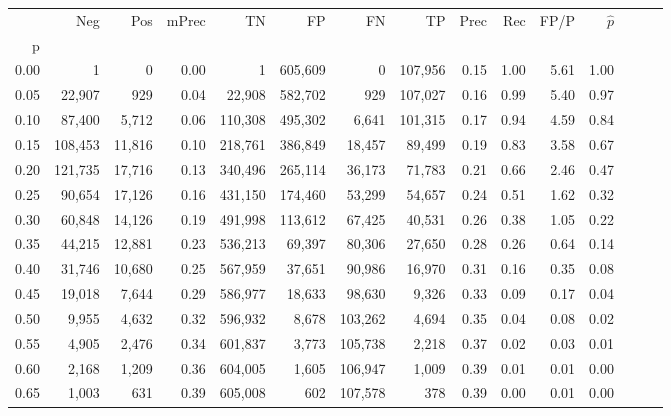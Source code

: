 \begin{tabular}{rrrrrrrrrrrrrrr}
\toprule
{} &      Neg &     Pos & mPrec &       TN &       FP &       FN &       TP &  Prec &   Rec &  FP/P & $\hat{p}$ \\
p    &          &         &       &          &          &          &          &       &       &       &           \\
\midrule
0.00 &        1 &       0 &  0.00 &        1 &  605,609 &        0 &  107,956 &  0.15 &  1.00 &  5.61 &      1.00 \\
0.05 &   22,907 &     929 &  0.04 &   22,908 &  582,702 &      929 &  107,027 &  0.16 &  0.99 &  5.40 &      0.97 \\
0.10 &   87,400 &   5,712 &  0.06 &  110,308 &  495,302 &    6,641 &  101,315 &  0.17 &  0.94 &  4.59 &      0.84 \\
0.15 &  108,453 &  11,816 &  0.10 &  218,761 &  386,849 &   18,457 &   89,499 &  0.19 &  0.83 &  3.58 &      0.67 \\
0.20 &  121,735 &  17,716 &  0.13 &  340,496 &  265,114 &   36,173 &   71,783 &  0.21 &  0.66 &  2.46 &      0.47 \\
0.25 &   90,654 &  17,126 &  0.16 &  431,150 &  174,460 &   53,299 &   54,657 &  0.24 &  0.51 &  1.62 &      0.32 \\
0.30 &   60,848 &  14,126 &  0.19 &  491,998 &  113,612 &   67,425 &   40,531 &  0.26 &  0.38 &  1.05 &      0.22 \\
0.35 &   44,215 &  12,881 &  0.23 &  536,213 &   69,397 &   80,306 &   27,650 &  0.28 &  0.26 &  0.64 &      0.14 \\
0.40 &   31,746 &  10,680 &  0.25 &  567,959 &   37,651 &   90,986 &   16,970 &  0.31 &  0.16 &  0.35 &      0.08 \\
0.45 &   19,018 &   7,644 &  0.29 &  586,977 &   18,633 &   98,630 &    9,326 &  0.33 &  0.09 &  0.17 &      0.04 \\
0.50 &    9,955 &   4,632 &  0.32 &  596,932 &    8,678 &  103,262 &    4,694 &  0.35 &  0.04 &  0.08 &      0.02 \\
0.55 &    4,905 &   2,476 &  0.34 &  601,837 &    3,773 &  105,738 &    2,218 &  0.37 &  0.02 &  0.03 &      0.01 \\
0.60 &    2,168 &   1,209 &  0.36 &  604,005 &    1,605 &  106,947 &    1,009 &  0.39 &  0.01 &  0.01 &      0.00 \\
0.65 &    1,003 &     631 &  0.39 &  605,008 &      602 &  107,578 &      378 &  0.39 &  0.00 &  0.01 &      0.00 \\

\end{tabular}
